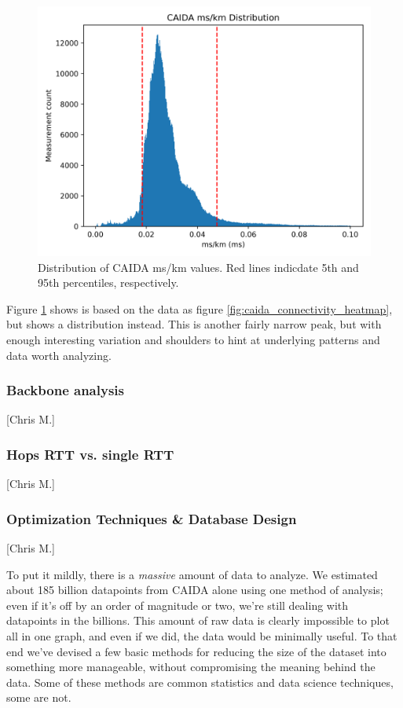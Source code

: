 \documentclass[12pt]{article}
\begin{document}
\begin{figure}[H]
    \centering
    \includegraphics[width=\textwidth]{images/CAIDA_connect_dist.png}
    \caption{Distribution of CAIDA ms/km values. Red lines indicdate 5th and 95th percentiles, respectively.}
    \label{fig:caida_connectivity_dist}
\end{figure}

Figure \ref{fig:caida_connectivity_dist} shows is based on the data as figure \ref{fig:caida_connectivity_heatmap}, but shows a distribution instead. This is another fairly narrow peak, but with enough interesting variation and shoulders to hint at underlying patterns and data worth analyzing.

\subsubsection{Backbone analysis}[Chris M.]
\subsubsection{Hops RTT vs. single RTT}[Chris M.]
\label{sec:optimization}\subsubsection{Optimization Techniques \& Database Design}[Chris M.]

To put it mildly, there is a \textit{massive} amount of data to analyze. We estimated about 185 billion datapoints from CAIDA alone using one method of analysis; even if it's off by an order of magnitude or two, we're still dealing with datapoints in the billions. This amount of raw data is clearly impossible to plot all in one graph, and even if we did, the data would be minimally useful. To that end we've devised a few basic methods for reducing the size of the dataset into something more manageable, without compromising the meaning behind the data. Some of these methods are common statistics and data science techniques, some are not.
\end{document}
